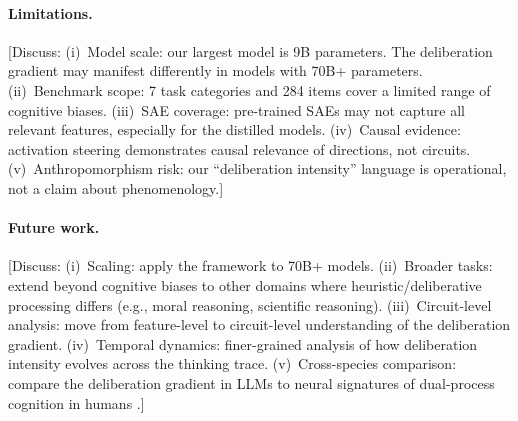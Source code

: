 \paragraph{Limitations.}
[Discuss: (i)~Model scale: our largest model is 9B parameters.  The
deliberation gradient may manifest differently in models with 70B+ parameters.
(ii)~Benchmark scope: 7 task categories and 284 items cover a limited range of
cognitive biases.  (iii)~SAE coverage: pre-trained SAEs may not capture all
relevant features, especially for the distilled models.  (iv)~Causal evidence:
activation steering demonstrates causal relevance of directions, not circuits.
(v)~Anthropomorphism risk: our ``deliberation intensity'' language is
operational, not a claim about phenomenology.]

\paragraph{Future work.}
[Discuss: (i)~Scaling: apply the framework to 70B+ models.
(ii)~Broader tasks: extend beyond cognitive biases to other domains where
heuristic/deliberative processing differs (e.g., moral reasoning, scientific
reasoning).  (iii)~Circuit-level analysis: move from feature-level to
circuit-level understanding of the deliberation gradient.  (iv)~Temporal
dynamics: finer-grained analysis of how deliberation intensity evolves across
the thinking trace.  (v)~Cross-species comparison: compare the deliberation
gradient in LLMs to neural signatures of dual-process cognition in humans
\citep{deneys2023dual}.]
